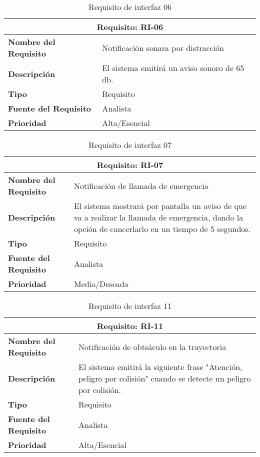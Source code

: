 \begin{table}[H]
\begin{center}
\begin{tabular}{p{} p{7cm}}
\multicolumn{2}{c}{\textbf{Requisito: RI-06} } \\
\hline \hline
\textbf{Nombre del Requisito} & Notificación sonara por distracción\\
\hline
\textbf{Descripción} & El sistema emitirá un aviso sonoro de 65 db. \\
\hline
\textbf{Tipo} & Requisito  \\
\hline
\textbf{Fuente del Requisito} & Analista \\
\hline
\textbf{Prioridad} & Alta/Esencial  \\ \hline
\end{tabular}
\caption{Requisito de interfaz 06}
\label{tab:RI-06}
\end{center}
\end{table}

\begin{table}[H]
\begin{center}
\begin{tabular}{p{} p{7cm}}
\multicolumn{2}{c}{\textbf{Requisito: RI-07} } \\
\hline \hline
\textbf{Nombre del Requisito} & Notificación de llamada de emergencia\\
\hline
\textbf{Descripción} & El sistema mostrará por pantalla un aviso de que va a realizar la llamada de emergencia, dando la opción de cancerlarlo en un tiempo de 5 segundos. \\
\hline
\textbf{Tipo} & Requisito  \\
\hline
\textbf{Fuente del Requisito} & Analista \\
\hline
\textbf{Prioridad} & Media/Deseada  \\ \hline
\end{tabular}
\caption{Requisito de interfaz 07}
\label{tab:RI-07}
\end{center}
\end{table}

\begin{table}[H]
\begin{center}
\begin{tabular}{p{} p{7cm}}
\multicolumn{2}{c}{\textbf{Requisito: RI-11} } \\
\hline \hline
\textbf{Nombre del Requisito} & Notificación de obtsáculo en la trayectoria\\
\hline
\textbf{Descripción} & El sistema emitirá la siguiente frase "Atención, peligro por colisión" cuando se detecte un peligro por colisión. \\
\hline
\textbf{Tipo} & Requisito  \\
\hline
\textbf{Fuente del Requisito} & Analista  \\
\hline
\textbf{Prioridad} & Alta/Esencial \\ \hline
\end{tabular}
\caption{Requisito de interfaz 11}
\label{tab:RI-11}
\end{center}
\end{table}

